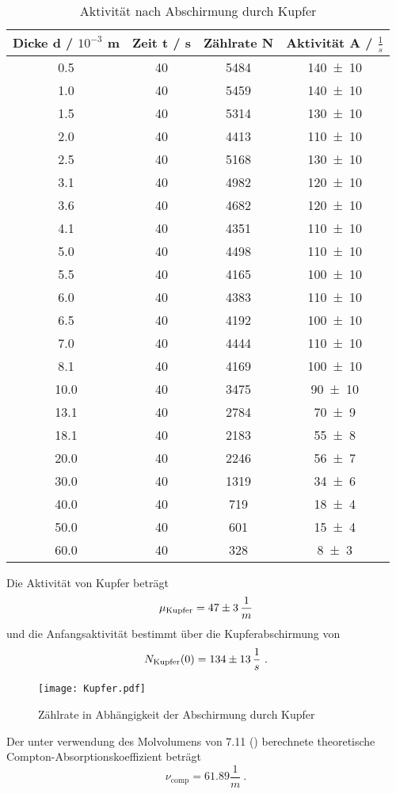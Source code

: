\begin{table}
  \centering
  \begin{tabular}{c c c c}
    \toprule
    Dicke d / $10^{-3}$ m & Zeit t / s & Zählrate N & Aktivität A / $\frac{1}{s}$ \\
    \midrule
    0.5		&40	&5484&	\num{140 +- 10} \\	
    1.0		&40	&5459&	\num{140 +- 10} \\	
    1.5		&40	&5314&	\num{130 +- 10} \\	
    2.0		&40	&4413&	\num{110 +- 10} \\	
    2.5		&40	&5168&	\num{130 +- 10} \\	
    3.1		&40	&4982&	\num{120 +- 10} \\	
    3.6		&40	&4682&	\num{120 +- 10} \\	
    4.1		&40	&4351&	\num{110 +- 10} \\	
    5.0		&40	&4498&	\num{110 +- 10} \\	
    5.5		&40	&4165&	\num{100 +- 10} \\	
    6.0		&40	&4383&	\num{110 +- 10} \\	
    6.5		&40	&4192&	\num{100 +- 10} \\	
    7.0		&40	&4444&	\num{110 +- 10} \\	
    8.1		&40	&4169&	\num{100 +- 10} \\	
    10.0	&40	&3475&	\num{90 +- 10} \\	
    13.1	&40 	&2784&	\num{70 +- 9} \\   	  
    18.1	&40	&2183&	\num{55 +- 8} \\	
    20.0	&40	&2246&	\num{56 +- 7} \\	
    30.0	&40 	&1319&	\num{34 +- 6} \\	     
    40.0    	&40 	&719&	\num{18 +- 4} \\	 
    50.0    	&40 	&601&	\num{15 +- 4} \\	 
    60.0	&40 	&328&	\num{8 +- 3} \\	 
    \bottomrule
  \end{tabular}
  \caption{Aktivität nach Abschirmung durch Kupfer}
  \label{tab:AKupfer}
\end{table}
Die Aktivität von Kupfer beträgt
\begin{equation}
  \mu_\text{Kupfer} = \num{ 47 +- 3 } \, \frac{1}{m}
  \label{eqn:muku}
\end{equation}
und die Anfangsaktivität bestimmt über die Kupferabschirmung von
\begin{equation}
  N_\text{Kupfer}(0) = \num{134 +- 13} \, \frac{1}{s} \ .
  \label{eqn:NKu}
\end{equation}
\begin{figure}
  \centering
  \texttt{[image: Kupfer.pdf]}
  \caption{Zählrate in Abhängigkeit der Abschirmung durch Kupfer}
  \label{fig:Kupfer}
\end{figure}
Der unter verwendung des Molvolumens von 7.11 (\cite{Kupfer}) berechnete theoretische Compton-Absorptionskoeffizient beträgt 
\begin{equation}
  \nu_\text{comp} = 61.89 \frac{1}{m} \ .
  \label{eqn:Kc}
\end{equation}

